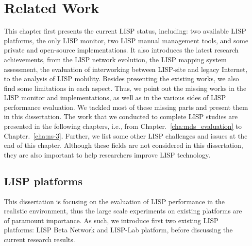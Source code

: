 
\chapter{Related Work}
\label{cha:related_work}

\ifpdf
    \graphicspath{{Chapter3/Pics/Raster/}{Chapter3/Pics/PDF/}{Chapter3/}}
\else
    \graphicspath{{Chapter3/Pics/Vector/}{Chapter3/}}
\fi
This chapter first presents the current LISP status, including: two available LISP platforms, the only LISP monitor, two LISP manual management tools, and some private and open-source implementations. It also introduces the latest research achievements, from the LISP network evolution, the LISP mapping system assessment, the evaluation of interworking between LISP-site and legacy Internet, to the analysis of LISP mobility. Besides presenting the existing works, we also find some limitations in each aspect. Thus, we point out the missing works in the LISP monitor and implementations, as well as in the various sides of LISP performance evaluation. We tackled most of these missing parts and present them in this dissertation. The work that we conducted to complete LISP studies are presented in the following chapters, i.e., from Chapter.~\ref{cha:mds_evaluation} to Chapter.~\ref{cha:ns-3}. Further, we list some other LISP challenges and issues at the end of this chapter. Although these fields are not considered in this dissertation, they are also important to help researchers improve LISP technology.


\section{LISP platforms}
\label{sec:platform}
This dissertation is focusing on the evaluation of LISP performance in the realistic environment, thus the large scale experiments on existing platforms are of paramount importance. As such, we introduce first two existing LISP platforms: LISP Beta Network and LISP-Lab platform, before discussing the current research results.

